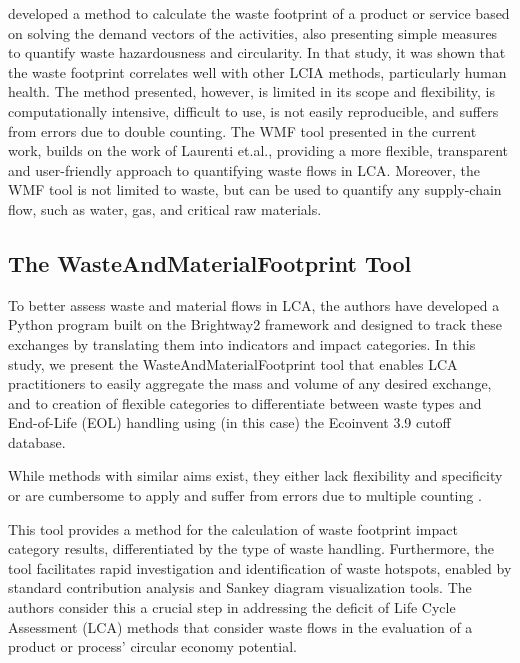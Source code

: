 \cite{laurenti2023wastefootprint} developed a method to calculate the waste footprint of a product or service based on solving the demand vectors of the activities, also presenting simple measures to quantify waste hazardousness and circularity. In that study, it was shown that the waste footprint correlates well with other LCIA methods, particularly human health. The method presented, however, is limited in its scope and flexibility, is computationally intensive, difficult to use, is not easily reproducible, and suffers from errors due to double counting. The WMF tool presented in the current work, builds on the work of Laurenti et.al., providing a more flexible, transparent and user-friendly approach to quantifying waste flows in LCA. Moreover, the WMF tool is not limited to waste, but can be used to quantify any supply-chain flow, such as water, gas, and critical raw materials. 


\subsection{The WasteAndMaterialFootprint Tool}

To better assess waste and material flows in LCA, the authors have developed a Python program built on the Brightway2 framework and designed to track these exchanges by translating them into indicators and impact categories. In this study, we present the WasteAndMaterialFootprint tool that enables LCA practitioners to easily aggregate the mass and volume of any desired exchange, and to creation of flexible categories to differentiate between waste types and End-of-Life (EOL) handling using (in this case) the Ecoinvent 3.9 cutoff database.

While methods with similar aims exist, they either lack flexibility and specificity \citep{foen2021ecofactors} or are cumbersome to apply and suffer from errors due to multiple counting \citep{laurenti2023wastefootprint}.

This tool provides a method for the calculation of waste footprint impact category results, differentiated by the type of waste handling. Furthermore, the tool facilitates rapid investigation and identification of waste hotspots, enabled by standard contribution analysis and Sankey diagram visualization tools. The authors consider this a crucial step in addressing the deficit of Life Cycle Assessment (LCA) methods that consider waste flows in the evaluation of a product or process' circular economy potential.





